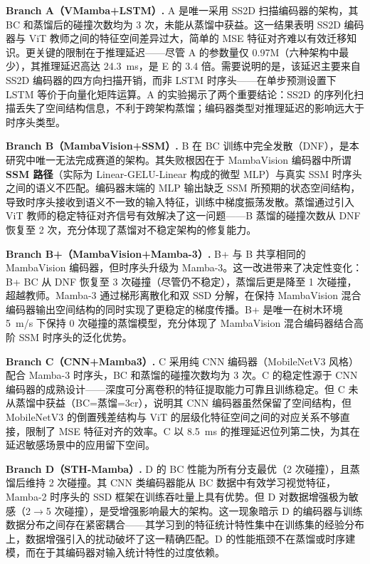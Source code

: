 \documentclass[12pt,a4paper]{article}
\numberwithin{equation}{section}
\numberwithin{figure}{section}
\numberwithin{table}{section}
\begin{document}
\textbf{Branch A（VMamba+LSTM）.} A 是唯一采用 SS2D 扫描编码器的架构，其 BC 和蒸馏后的碰撞次数均为 3 次，未能从蒸馏中获益。这一结果表明 SS2D 编码器与 ViT 教师之间的特征空间差异过大，简单的 MSE 特征对齐难以有效迁移知识。更关键的限制在于推理延迟——尽管 A 的参数量仅 0.97M（六种架构中最少），其推理延迟高达 24.3~ms，是 E 的 3.4 倍。需要说明的是，该延迟主要来自 SS2D 编码器的四方向扫描开销，而非 LSTM 时序头——在单步预测设置下 LSTM 等价于向量化矩阵运算。A 的实验揭示了两个重要结论：SS2D 的序列化扫描丢失了空间结构信息，不利于跨架构蒸馏；编码器类型对推理延迟的影响远大于时序头类型。

\textbf{Branch B（MambaVision+SSM）.} B 在 BC 训练中完全发散（DNF），是本研究中唯一无法完成赛道的架构。其失败根因在于 MambaVision 编码器中所谓\textbf{SSM 路径}（实际为 Linear-GELU-Linear 构成的微型 MLP）与真实 SSM 时序头之间的语义不匹配。编码器末端的 MLP 输出缺乏 SSM 所预期的状态空间结构，导致时序头接收到语义不一致的输入特征，训练中梯度振荡发散。蒸馏通过引入 ViT 教师的稳定特征对齐信号有效解决了这一问题——B 蒸馏的碰撞次数从 DNF 恢复至 2 次，充分体现了蒸馏对不稳定架构的修复能力。

\textbf{Branch B+（MambaVision+Mamba-3）.} B+ 与 B 共享相同的 MambaVision 编码器，但时序头升级为 Mamba-3。这一改进带来了决定性变化：B+ BC 从 DNF 恢复至 3 次碰撞（尽管仍不稳定），蒸馏后更是降至 1 次碰撞，超越教师。Mamba-3 通过梯形离散化和双 SSD 分解，在保持 MambaVision 混合编码器输出空间结构的同时实现了更稳定的梯度传播。B+ 是唯一在树木环境 5~m/s 下保持 0 次碰撞的蒸馏模型，充分体现了 MambaVision 混合编码器结合高阶 SSM 时序头的泛化优势。

\textbf{Branch C（CNN+Mamba3）.} C 采用纯 CNN 编码器（MobileNetV3 风格）配合 Mamba-3 时序头，BC 和蒸馏的碰撞次数均为 3 次。C 的稳定性源于 CNN 编码器的成熟设计——深度可分离卷积的特征提取能力可靠且训练稳定。但 C 未从蒸馏中获益（BC=蒸馏=3cr），说明其 CNN 编码器虽然保留了空间结构，但 MobileNetV3 的倒置残差结构与 ViT 的层级化特征空间之间的对应关系不够直接，限制了 MSE 特征对齐的效率。C 以 8.5~ms 的推理延迟位列第二快，为其在延迟敏感场景中的应用留下空间。

\textbf{Branch D（STH-Mamba）.} D 的 BC 性能为所有分支最优（2 次碰撞），且蒸馏后维持 2 次碰撞。其 CNN 类编码器能从 BC 数据中有效学习视觉特征，Mamba-2 时序头的 SSD 框架在训练吞吐量上具有优势。但 D 对数据增强极为敏感（2$\rightarrow$5 次碰撞），是受增强影响最大的架构。这一现象暗示 D 的编码器与训练数据分布之间存在紧密耦合——其学习到的特征统计特性集中在训练集的经验分布上，数据增强引入的扰动破坏了这一精确匹配。D 的性能瓶颈不在蒸馏或时序建模，而在于其编码器对输入统计特性的过度依赖。
\end{document}
